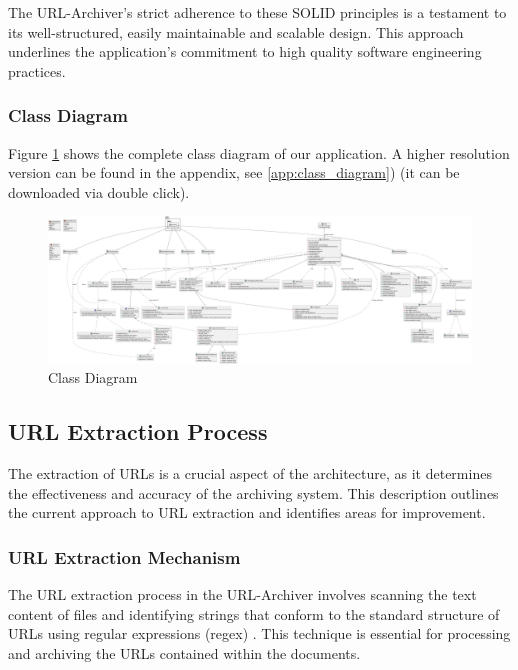 The URL-Archiver's strict adherence to these SOLID principles  is a testament to its well-structured, easily maintainable and scalable design. This approach underlines the application's commitment to high quality software engineering practices.
\begin{landscape}
	\thispagestyle{empty}
	\subsubsection{Class Diagram}
	Figure \ref{fig:class_diagram} shows the complete class diagram of our application. A higher resolution version can be found in the appendix, see \ref{app:class_diagram}) (it can be downloaded via double click). 
	\begin{figure}[h!]
		\includegraphics[width=1.9\textwidth]{./diagrams/class_diagram.pdf}
		\centering
		\caption{Class Diagram}
		\label{fig:class_diagram}
	\end{figure}

\end{landscape}
\restoregeometry

\subsection{URL Extraction Process}

The extraction of URLs is a crucial aspect of the architecture, as it determines the effectiveness and accuracy of the archiving system. This description outlines the current approach to URL extraction and identifies areas for improvement.

\subsubsection{URL Extraction Mechanism}
The URL extraction process in the URL-Archiver involves scanning the text content of files and identifying strings that conform to the standard structure of URLs using regular expressions (\gls{regex}) . This technique is essential for processing and archiving the URLs contained within the documents.

